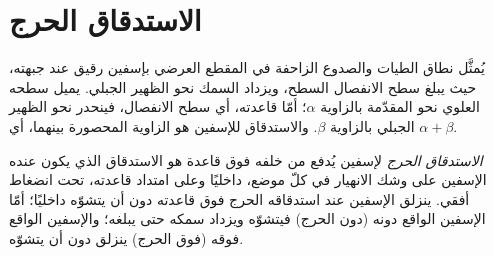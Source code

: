 \begin{omfigure}
\par{}\label{fig:b3:orogenic-wedges:duplex}
\end{omfigure}


\section{الاستدقاق الحرج}\label{sec:b3:orogenic-wedges:taper}

يُمثَّل نطاق الطيات والصدوع الزاحفة في المقطع العرضي بإسفين رقيق عند جبهته، حيث
يبلغ سطح الانفصال السطح، ويزداد السمك نحو الظهير الجبلي.
يميل سطحه العلوي نحو المقدّمة بالزاوية $\alpha$؛ أمّا قاعدته، أي سطح الانفصال،
فينحدر نحو الظهير الجبلي بالزاوية $\beta$. والاستدقاق
للإسفين هو الزاوية المحصورة بينهما، أي $\alpha + \beta$.

\begin{definition}\label{def:b3:orogenic-wedges:critical-taper}
\emph{الاستدقاق الحرج} لإسفين يُدفع من خلفه
فوق قاعدة هو الاستدقاق الذي يكون عنده الإسفين على وشك الانهيار في كلّ موضع،
داخليًا وعلى امتداد قاعدته، تحت انضغاط أفقي. ينزلق الإسفين عند استدقاقه الحرج
فوق قاعدته دون أن يتشوّه داخليًا؛ أمّا الإسفين الواقع دونه (دون الحرج)
فيتشوّه ويزداد سمكه حتى يبلغه؛ والإسفين الواقع فوقه (فوق الحرج)
ينزلق دون أن يتشوّه.
\end{definition}

